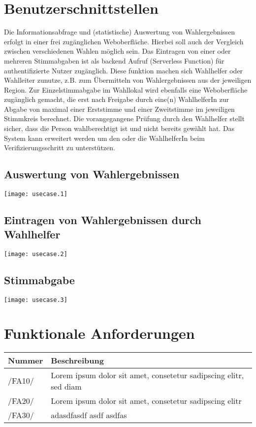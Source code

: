 \documentclass[a4paper,12pt]{article}
\newcommand\addrow[2]{#1 &#2\\ }
\newcommand\addheading[2]{#1 &#2\\ \hline}
\newcommand\tabularhead{\begin{tabular}{lp{13cm}}
\hline
}
\newenvironment{usecase}{\tabularhead}
{\hline\end{tabular}}
\begin{document}
\section{Benutzerschnittstellen}
Die Informationsabfrage und (statistische) Auswertung von Wahlergebnissen erfolgt
in einer frei zugänglichen Weboberfläche. Hierbei soll auch der Vergleich zwischen verschiedenen
Wahlen möglich sein.
%
Das Eintragen von einer oder mehreren Stimmabgaben ist als backend Aufruf (Serverless Function)
für authentifizierte Nutzer zugänglich. Diese funktion machen sich Wahlhelfer oder Wahlleiter zunutze,
z.B. zum Übermitteln von Wahlergebnissen aus der jeweiligen Region.
%
Zur Einzelstimmabgabe im Wahllokal wird ebenfalls eine Weboberfläche zugänglich gemacht,
die erst nach Freigabe durch eine(n) WahlhelferIn zur Abgabe von maximal einer Erststimme
und einer Zweitstimme im jeweiligen Stimmkreis berechnet. Die vorangegangene Prüfung
durch den Wahlhelfer stellt sicher, dass die Person wahlberechtigt ist und nicht bereits
gewählt hat. Das System kann erweitert werden um den oder die WahlhelferIn beim
Verifizierungsschritt zu unterstützen.

\subsection{Auswertung von Wahlergebnissen}
\begin{center}
  \texttt{[image: usecase.1]}
\end{center}

\subsection{Eintragen von Wahlergebnissen durch Wahlhelfer}
\begin{center}
  \texttt{[image: usecase.2]}
\end{center}

\subsection{Stimmabgabe}
\begin{center}
  \texttt{[image: usecase.3]}
\end{center}

\section{Funktionale Anforderungen}
\begin{usecase}
  \addheading{Nummer}{Beschreibung} 
  \addrow{/FA10/}{Lorem ipsum dolor sit amet, consetetur sadipscing elitr, sed diam}
  \addrow{/FA20/}{Lorem ipsum dolor sit amet, consetetur sadipscing elitr}
  \addrow{/FA30/}{adasdfasdf asdf asdfas}
\end{usecase}
\end{document}
